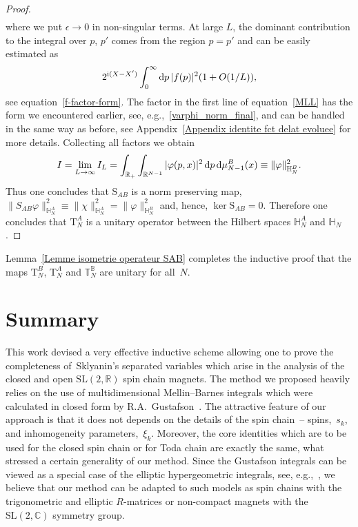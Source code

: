 \documentclass[pdftex]{sigma}%
\numberwithin{equation}{section}
\begin{document}
\begin{proof}
\begin{align}
\end{align}
where we put $\epsilon\to 0$ in non-singular terms. At large $L$, the dominant contribution to the integral over $p$, $p'$ comes from the
region $p=p'$ and can be easily estimated as
\begin{gather*}
2^{{\rm i}(X-X')}\int_0^\infty {\rm d}p \,|f(p)|^2 (1+O(1/ L)),
\end{gather*}
see equation~\eqref{f-factor-form}. The factor in the first line of equation~\eqref{MLL} has the form we encountered earlier, see,
e.g.,~\eqref{varphi_norm_final}, and can be handled in the same way as before, see Appendix~\ref{Appendix identite fct delat evoluee} for
more details. Collecting all factors we obtain
\begin{gather*}
I=\lim_{L\to\infty} I_L=\int_{\mathbb R_+} \int_{\mathbb R^{N-1}} |\varphi(p,x)|^2 \, {\rm d}p\,{\rm d}\mu_{N-1}^B(x)\equiv \|\varphi\|^2_{\mathbb H_{N}^B}.
\end{gather*}
Thus one concludes that $\mathrm S_{AB}$ is a norm preserving map, $\|S_{AB}\varphi\|^2_{\mathbb H_N^A}\equiv\|\chi\|^2_{\mathbb H_N^A}=
\|\varphi\|^2_{\mathbb H_N^B}$ and, hence, $\ker \mathrm S_{AB}=0$. Therefore one concludes that $\mathrm T_{N}^A$ is a unitary operator
between the Hilbert spaces $\mathbb H_{N}^A$ and $\mathbb H_N$.
\end{proof}

Lemma~\ref{Lemme isometrie operateur SAB} completes the inductive proof that the maps $\mathrm T_N^B$, $\mathrm T_N^A$ and $\mathbb
T_N^{\mathbb B}$ are unitary for all~$N$.

\section{Summary}

This work devised a very effective inductive scheme allowing one to prove the completeness of~Sklyanin's separated variables which arise
in the analysis of the closed and open $\mathrm{SL}(2,\mathbb R)$ spin chain magnets. The method we proposed heavily relies on the use of
multidimensional Mellin--Barnes integrals which were calculated in closed form by R.A.~Gustafson~\cite{MR1139492}. The attractive feature
of our approach is that it does not depends on the details of the spin chain~-- spins,~$s_k$, and inhomogeneity parameters,~$\xi_k$.
Moreover, the core identities which are to be used for the closed spin chain or for Toda chain are exactly the same, what stressed a
certain generality of our method. Since the Gustafson integrals can be viewed as a special case of the elliptic hypergeometric integrals,
see, e.g.,~\cite{MR2630038,MR2479997},
 we believe that our method can be adapted to such models as spin chains with the trigonometric and elliptic
$R$-matrices or non-compact magnets with the $\mathrm{SL}(2,\mathbb C)$ symmetry group.
\end{document}
